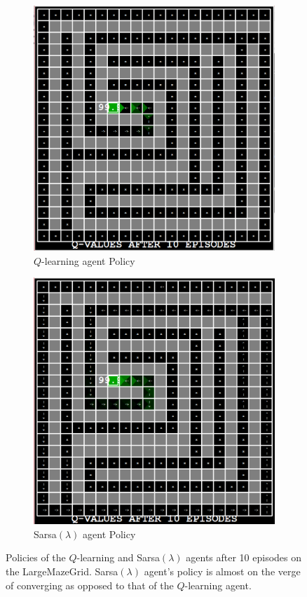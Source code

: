 \documentclass[10pt,conference]{IEEEtran}
\begin{document}
	\begin{figure}[h]
		\centering
		\begin{subfigure}[b]{0.40\textwidth}
			\includegraphics[width=\textwidth]{./images/qlearning_largeMaze_10}
			\caption{\(Q\)-learning agent Policy}
		\end{subfigure}%
		\begin{subfigure}[b]{0.40\textwidth}
			\includegraphics[width=\textwidth]{./images/sarsa_largeMaze_10}
			\caption{Sarsa\((\lambda)\) agent Policy}
		\end{subfigure}
		\caption{Policies of the \(Q\)-learning and Sarsa\((\lambda)\) agents 
		after 10 episodes on the LargeMazeGrid. Sarsa\((\lambda)\) agent's policy is almost on the verge of converging as opposed to that of the \(Q\)-learning agent.}
		\label{qvalues}
	\end{figure}
\end{document}

